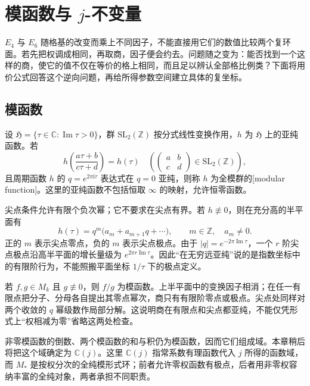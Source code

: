 \section{模函数与 \texorpdfstring{\(j\)}{j}-不变量}
\label{b3:sec:2306}

\(E_4\) 与 \(E_6\) 随格基的改变而乘上不同因子，不能直接用它们的数值比较两个复环面。若先把权调成相同，再取商，因子便会约去。问题随之变为：能否找到一个这样的商，使它的值不仅在等价的格上相同，而且足以辨认全部格比例类？下面将用价公式回答这个逆向问题，再给所得参数空间建立具体的复坐标。

\subsection{模函数}
\label{b3:subsec:230601}

\begin{definition}\label{b3:def:23-modular-function}
设 \(\mathfrak H=\{\tau\in\mathbb C:\operatorname{Im}\tau>0\}\)，群 \(\mathrm{SL}_2(\mathbb Z)\) 按分式线性变换作用，\(h\) 为 \(\mathfrak H\) 上的亚纯函数。若
\[
 h\left(\frac{a\tau+b}{c\tau+d}\right)=h(\tau)
 \quad\left(\begin{pmatrix}a&b\\c&d\end{pmatrix}\in\mathrm{SL}_2(\mathbb Z)\right),
\]
且周期函数 \(h\) 的 \(q=e^{2\pi\mathrm i\tau}\) 表达式在 \(q=0\) 亚纯，则称 \(h\) 为全模群的[modular function]。这里的亚纯函数不包括恒取 \(\infty\) 的映射，允许恒零函数。
\end{definition}

尖点条件允许有限个负次幂；它不要求在尖点有界。若 \(h\not\equiv0\)，则在充分高的半平面有
\[
 h(\tau)=q^m\bigl(a_m+a_{m+1}q+\cdots\bigr),
 \qquad m\in\mathbb Z,\quad a_m\ne0.
\]
正的 \(m\) 表示尖点零点，负的 \(m\) 表示尖点极点。由于 \(|q|=e^{-2\pi\operatorname{Im}\tau}\)，一个 \(r\) 阶尖点极点沿高半平面的增长量级为 \(e^{2\pi r\operatorname{Im}\tau}\)。因此“在无穷远亚纯”说的是指数坐标中的有限阶行为，不能照搬平面坐标 \(1/\tau\) 下的极点定义。

\ProseParagraphBreak
若 \(f,g\in M_k\) 且 \(g\not\equiv0\)，则 \(f/g\) 为模函数。上半平面中的变换因子相消；在任一有限点把分子、分母各自提出其零点幂次，商只有有限阶零点或极点。尖点处同样对两个收敛的 \(q\) 幂级数作局部分解。这说明商在有限点和尖点都亚纯，不能仅凭形式上“权相减为零”省略这两处检查。

\ProseParagraphBreak
非零模函数的倒数、两个模函数的和与积仍为模函数，因而它们组成域。本章稍后将把这个域确定为 \(\mathbb C(j)\)。这里 \(\mathbb C(j)\) 指常系数有理函数代入 \(j\) 所得的函数域，而 \(M_*\) 是按权分次的全纯模形式环；前者允许零权函数有极点，后者用非零权容纳丰富的全纯对象，两者承担不同职责。

